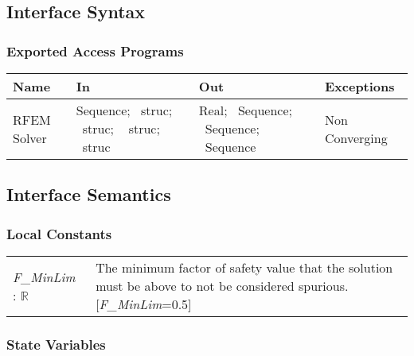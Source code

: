 \documentclass[12pt]{article}
\begin{document}
\subsection{Interface Syntax}

\subsubsection{Exported Access Programs}
\begin{center}
\renewcommand*{\arraystretch}{1.5}
\begin{tabular}{| p{} | p{} | 
p{} | p{} |} \hline  

  \textbf{Name} & \textbf{In} & \textbf{Out} & \textbf{Exceptions}
  \\ \hline

  RFEM Solver & Sequence; ~\newline struc; ~\newline struc; ~\newline
  struc; ~\newline struc & Real; ~\newline Sequence; ~\newline Sequence;
  ~\newline Sequence & Non Converging \\ \hline
\end{tabular}
\end{center}

\subsection{Interface Semantics}

\subsubsection{Local Constants}

\renewcommand*{\arraystretch}{1.5}
\begin{longtable}{p{} p{}}
  \textit{F\_MinLim} : $\mathbb{R}$ &  The minimum factor of safety
  value that the solution must be above to not be considered
  spurious. [\textit{F\_MinLim}=0.5]\\
\end{longtable}

\subsubsection{State Variables}
\end{document}
